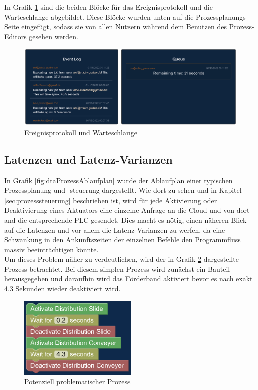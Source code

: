 In Grafik \ref{fig:eventLogAndQueue} sind die beiden Blöcke für das Ereignisprotokoll und die Warteschlange abgebildet. Diese Blöcke wurden unten auf die Prozessplanungs-Seite eingefügt, sodass sie von allen Nutzern während dem Benutzen des Prozess-Editors gesehen werden.
%
\begin{figure}[htbp]
	\centering\includegraphics[width=1.0\textwidth]{images/06/EventLogAndQueue.eps}
    \caption{Ereignisprotokoll und Warteschlange}
    \label{fig:eventLogAndQueue}
\end{figure}

\subsection{Latenzen und Latenz-Varianzen}
\label{subsec:latenzen}

In Grafik \ref{fig:dtaProzessAblaufplan} wurde der Ablaufplan einer typischen Prozessplanung und -steuerung dargestellt. Wie dort zu sehen und in Kapitel \ref{sec:prozesssteuerung} beschrieben ist, wird für jede Aktivierung oder Deaktivierung eines Aktuators eine einzelne Anfrage an die Cloud und von dort and die entsprechende PLC gesendet. Dies macht es nötig, einen näheren Blick auf die Latenzen und vor allem die Latenz-Varianzen zu werfen, da eine Schwankung in den Ankunftszeiten der einzelnen Befehle den Programmfluss massiv beeinträchtigen könnte.\\
Um dieses Problem näher zu verdeutlichen, wird der in Grafik \ref{fig:PotenziellProblematischerProzess} dargestellte Prozess betrachtet. Bei diesem simplen Prozess wird zunächst ein Bauteil herausgegeben und daraufhin wird das Förderband aktiviert bevor es nach exakt 4,3 Sekunden wieder deaktiviert wird.
%
\begin{figure}[htbp]
	\centering\includegraphics[width=0.5\textwidth]{images/06/LatenzVarianzProblem.eps}
    \caption{Potenziell problematischer Prozess}
    \label{fig:PotenziellProblematischerProzess}
\end{figure}

